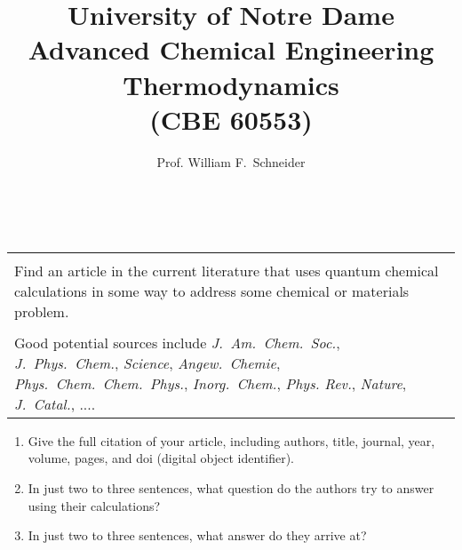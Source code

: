 \documentclass[12pt]{article}
\title{University of Notre Dame\\Advanced Chemical Engineering Thermodynamics\\(CBE 60553)}
\author{Prof. William F.\ Schneider}
\begin{document}
\ \newline
\begin{center}
\begin{tabular}{|p{6in}|}
\hline
\noindent {\bf Lecture 0: The Context of Computational Chemistry} \\
Find an article in the current literature that uses quantum chemical
calculations in some way to address some chemical or materials problem.  \\ \\
Good potential sources include {\em
  J.\ Am.\ Chem.\ Soc.}, {\em J.\ Phys.\ Chem.}, {\em Science}, {\em
  Angew.\ Chemie}, {\em Phys.\ Chem.\ Chem.\ Phys.}, {\em Inorg.\ Chem.},
{\em Phys. Rev.}, {\em Nature}, {\em J.\ Catal.}, .... \\
\hline
\end{tabular}
\end{center}

\begin{enumerate}
\item Give the full citation of your article, including authors,
  title, journal, year, volume, pages, and doi (digital object identifier).
\item In just two to three sentences, what question do the authors try
  to answer using their calculations?
\item In just two to three sentences, what answer do they arrive at?
\end{enumerate}
\end{document}
